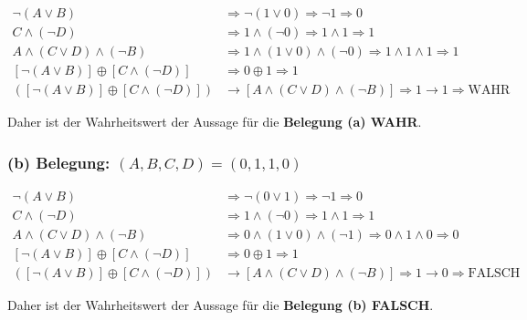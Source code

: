 \documentclass[12pt]{article}
\begin{document}
\begin{align*}
	\neg (A \lor B)                                 & \Rightarrow \neg (1 \lor 0) \Rightarrow \neg 1 \Rightarrow 0                                        \\
	C \land (\neg D)                                & \Rightarrow 1 \land (\neg 0) \Rightarrow 1 \land 1 \Rightarrow 1                                    \\
	A \land (C \lor D) \land (\neg B)               & \Rightarrow 1 \land (1 \lor 0) \land (\neg 0) \Rightarrow 1 \land 1 \land 1 \Rightarrow 1           \\
	[ \neg (A \lor B)] \oplus [C \land ( \neg D)]   & \Rightarrow 0 \oplus 1 \Rightarrow 1                                                                \\
	([ \neg (A \lor B)] \oplus [C \land ( \neg D)]) & \rightarrow [A \land(C \lor D) \land ( \neg B)] \Rightarrow 1 \rightarrow 1 \Rightarrow \text{WAHR}
\end{align*}

Daher ist der Wahrheitswert der Aussage für die \textbf{Belegung (a) WAHR}.

\subsubsection*{(b) Belegung: \( (A,B,C,D) = (0,1,1,0) \)}

\begin{align*}
	\neg (A \lor B)                                 & \Rightarrow \neg (0 \lor 1) \Rightarrow \neg 1 \Rightarrow 0                                          \\
	C \land (\neg D)                                & \Rightarrow 1 \land (\neg 0) \Rightarrow 1 \land 1 \Rightarrow 1                                      \\
	A \land (C \lor D) \land (\neg B)               & \Rightarrow 0 \land (1 \lor 0) \land (\neg 1) \Rightarrow 0 \land 1 \land 0 \Rightarrow 0             \\
	[ \neg (A \lor B)] \oplus [C \land ( \neg D)]   & \Rightarrow 0 \oplus 1 \Rightarrow 1                                                                  \\
	([ \neg (A \lor B)] \oplus [C \land ( \neg D)]) & \rightarrow [A \land(C \lor D) \land ( \neg B)] \Rightarrow 1 \rightarrow 0 \Rightarrow \text{FALSCH}
\end{align*}

Daher ist der Wahrheitswert der Aussage für die \textbf{Belegung (b) FALSCH}.
\end{document}
